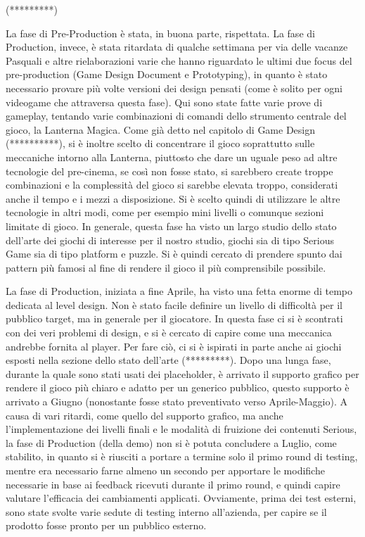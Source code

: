 (*********)

La fase di Pre-Production è stata, in buona parte, rispettata. La fase di Production, invece, è stata ritardata di qualche settimana per via delle vacanze Pasquali e altre rielaborazioni varie che hanno riguardato le ultimi due focus del pre-production (Game Design Document e Prototyping), in quanto è stato necessario provare più volte versioni dei design pensati (come è solito per ogni videogame che attraversa questa fase). Qui sono state fatte varie prove di gameplay, tentando varie combinazioni di comandi dello strumento centrale del gioco, la Lanterna Magica. Come già detto nel capitolo di Game Design (**********), si è inoltre scelto di concentrare il gioco soprattutto sulle meccaniche intorno alla Lanterna, piuttosto che dare un uguale peso ad altre tecnologie del pre-cinema, se così non fosse stato, si sarebbero create troppe combinazioni e la complessità del gioco si sarebbe elevata troppo, considerati anche il tempo e i mezzi a disposizione. Si è scelto quindi di utilizzare le altre tecnologie in altri modi, come per esempio mini livelli o comunque sezioni limitate di gioco. In generale, questa fase ha visto un largo studio dello stato dell'arte dei giochi di interesse per il nostro studio, giochi sia di tipo Serious Game sia di tipo platform e puzzle. Si è quindi cercato di prendere spunto dai pattern più famosi al fine di rendere il gioco il più comprensibile possibile.

La fase di Production, iniziata a fine Aprile, ha visto una fetta enorme di tempo dedicata al level design. Non è stato facile definire un livello di difficoltà per il pubblico target, ma in generale per il giocatore. In questa fase ci si è scontrati con dei veri problemi di design, e si è cercato di capire come una meccanica andrebbe fornita al player. Per fare ciò, ci si è ispirati in parte anche ai giochi esposti nella sezione dello stato dell'arte (*********). Dopo una lunga fase, durante la quale sono stati usati dei placeholder, è arrivato il supporto grafico per rendere il gioco più chiaro e adatto per un generico pubblico, questo supporto è arrivato a Giugno (nonostante fosse stato preventivato verso Aprile-Maggio). A causa di vari ritardi, come quello del supporto grafico, ma anche l'implementazione dei livelli finali e le modalità di fruizione dei contenuti Serious, la fase di Production (della demo) non si è potuta concludere a Luglio, come stabilito, in quanto si è riusciti a portare a termine solo il primo round di testing, mentre era necessario farne almeno un secondo per apportare le modifiche necessarie in base ai feedback ricevuti durante il primo round, e quindi capire valutare l'efficacia dei cambiamenti applicati. Ovviamente, prima dei test esterni, sono state svolte varie sedute di testing interno all'azienda, per capire se il prodotto fosse pronto per un pubblico esterno.


